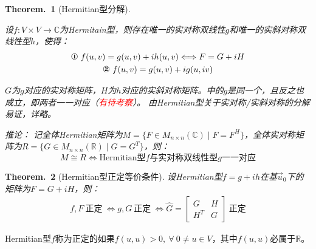 \documentclass[zihao=-4,UTF8]{report}
\theoremstyle{mystyle} %
\newtheorem{theorem}{Theorem.\,}
\begin{document}
\begin{theorem}[Hermitian型分解]\label{Hermitian型分解}

设$f: V\times V\longrightarrow \mathbb{C}$为Hermitain型，则存在唯一的实对称双线性$g$和唯一的实斜对称双线性型$h$，使得：
\begin{gather*}
    \text{\ding{172}}\ f(u,v)= g(u,v)+ih(u,v) \Longleftrightarrow F = G+iH\\
    \text{\ding{173}}\ f(u,v) = g(u,v) + ig(u,iv) 
\end{gather*}

{\par\color{gray}\small
$G$为$g$对应的实对称矩阵，$H$为$h$对应的实斜对称矩阵。中的$g$是同一个，且反之也成立，即两者一一对应（\textcolor{red}{有待考察}）。
由Hermitian型关于实对称/实斜对称的分解易证，详略。
\par}
推论：
记全体Hermitian矩阵为$M = \{F\in M_{n\times n}(\mathbb{C}) \mid F = F^H\}$，全体实对称矩阵为$R = \{G\in M_{n\times n}(\mathbb{R}) \mid G = G^T\}$，则：
\begin{equation*}
    M \cong R \Longleftrightarrow \text{Hermitian型$f$与实对称双线性型$g$一一对应}
\end{equation*}
\end{theorem}

\begin{theorem}[Hermitian型正定等价条件]\label{Hermitian型正定等价条件}
设Hermitian型$f = g+ih$在基$\vec{u}_0$下的矩阵为$F = G +iH$，则：
\begin{gather*}
    f,F\ \text{正定}\ \Longleftrightarrow g,G\ \text{正定}\ \Longleftrightarrow \hat{G} = \begin{bmatrix}
        G &H\\
        H^ T&G
    \end{bmatrix}\ \text{正定}
\end{gather*}
\end{theorem}
{\par\color{gray}\small
Hermitian型$f$称为正定的如果$f(u,u) > 0,\ \forall\ 0 \ne u \in V$，其中$f(u,u)$必属于$\mathbb{R}$。
\par}
\end{document}
